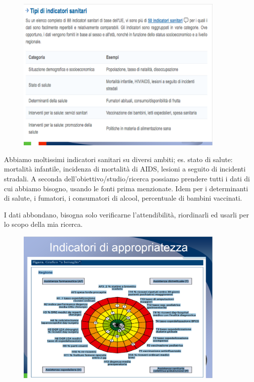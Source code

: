 \begin{figure}[!ht]
\centering
	\includegraphics[width=0.9\textwidth]{02/image5.png}
\end{figure}


Abbiamo moltissimi indicatori sanitari su diversi ambiti; es. stato di
salute: mortalità infantile, incidenza di mortalità di AIDS, lesioni a
seguito di incidenti stradali. A seconda dell'obiettivo/studio/ricerca
possiamo prendere tutti i dati di cui abbiamo bisogno, usando le fonti
prima menzionate. Idem per i determinanti di salute, i fumatori, i
consumatori di alcool, percentuale di bambini vaccinati.

I dati abbondano, bisogna solo verificarne l'attendibilità, riordinarli
ed usarli per lo scopo della mia ricerca.
\begin{figure}[!ht]
\centering
	\includegraphics[width=0.9\textwidth]{02/image6.png}
\end{figure}


